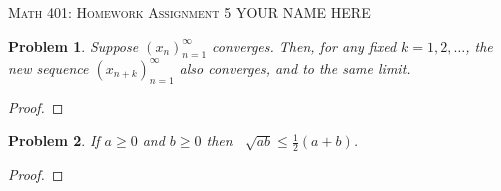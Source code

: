 \documentclass[12pt]{article}
\newtheorem{problem}{Problem}
\begin{document}
\small
\noindent \textsc{Math 401: Homework Assignment 5} \hfill YOUR NAME HERE

\normalsize
\bigskip

\setcounter{problem}{28}


\begin{problem} %
Suppose $(x_n)_{n=1}^\infty$ converges.  Then, for any fixed $k=1,2,\dots$, the new sequence $(x_{n+k})_{n=1}^\infty$ also converges, and to the same limit.
\end{problem}


\begin{proof}
\end{proof}


\begin{problem} %
If $a\ge 0$ and $b\ge 0$ then \, $\displaystyle \sqrt{ab} \le \frac{1}{2}\left(a+b\right)$.
\end{problem}


\begin{proof}
\end{proof}
\end{document}
